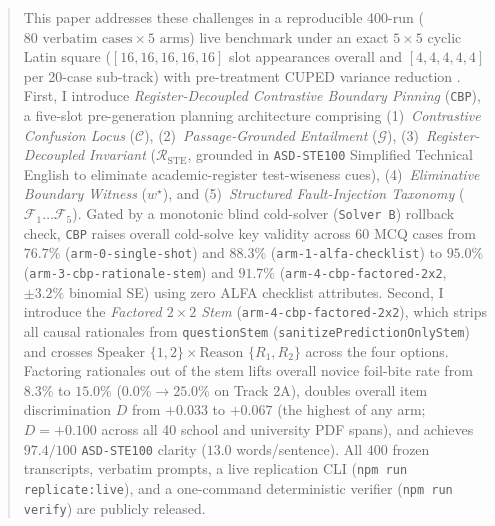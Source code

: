 \documentclass[11pt,a4paper]{article}
\begin{document}
\begin{abstract}
This paper addresses these challenges in a reproducible 400-run ($80\text{ verbatim cases} \times 5\text{ arms}$) live benchmark under an exact $5\times 5$ cyclic Latin square ($[16,16,16,16,16]$ slot appearances overall and $[4,4,4,4,4]$ per 20-case sub-track) with pre-treatment CUPED variance reduction \cite{deng2013cuped}. First, I introduce \emph{Register-Decoupled Contrastive Boundary Pinning} (\texttt{CBP}), a five-slot pre-generation planning architecture comprising (1)~\emph{Contrastive Confusion Locus} ($\mathcal{C}$), (2)~\emph{Passage-Grounded Entailment} ($\mathcal{G}$), (3)~\emph{Register-Decoupled Invariant} ($\mathcal{R}_{\text{STE}}$, grounded in \texttt{ASD-STE100} Simplified Technical English to eliminate academic-register test-wiseness cues), (4)~\emph{Eliminative Boundary Witness} ($w^\star$), and (5)~\emph{Structured Fault-Injection Taxonomy} ($\mathcal{F}_1\dots\mathcal{F}_5$). Gated by a monotonic blind cold-solver (\texttt{Solver B}) rollback check, \texttt{CBP} raises overall cold-solve key validity across $60$ MCQ cases from $76.7\%$ (\texttt{arm-0-single-shot}) and $88.3\%$ (\texttt{arm-1-alfa-checklist}) to $95.0\%$ (\texttt{arm-3-cbp-rationale-stem}) and $91.7\%$ (\texttt{arm-4-cbp-factored-2x2}, $\pm 3.2\%$ binomial SE) using zero ALFA checklist attributes. Second, I introduce the \emph{Factored $2\times 2$ Stem} (\texttt{arm-4-cbp-factored-2x2}), which strips all causal rationales from \texttt{questionStem} (\texttt{sanitizePredictionOnlyStem}) and crosses $\text{Speaker } \{1,2\} \times \text{Reason } \{R_1,R_2\}$ across the four options. Factoring rationales out of the stem lifts overall novice foil-bite rate from $8.3\%$ to $15.0\%$ ($0.0\% \to 25.0\%$ on Track 2A), doubles overall item discrimination $D$ from $+0.033$ to $+0.067$ (the highest of any arm; $D = +0.100$ across all 40 school and university PDF spans), and achieves $97.4/100$ \texttt{ASD-STE100} clarity ($13.0$ words/sentence). All $400$ frozen transcripts, verbatim prompts, a live replication CLI (\texttt{npm run replicate:live}), and a one-command deterministic verifier (\texttt{npm run verify}) are publicly released.
\end{abstract}
\end{document}

